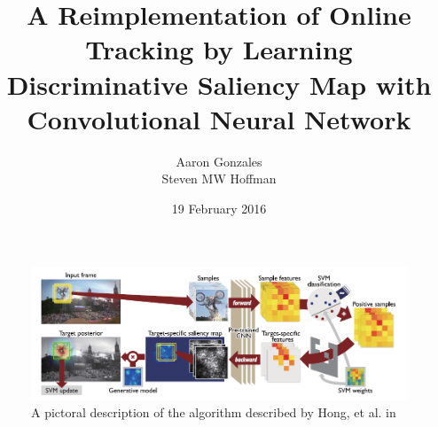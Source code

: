 \documentclass{sig-alternate-05-2015}
\begin{document}


\title{A Reimplementation of Online Tracking by Learning Discriminative Saliency Map with Convolutional Neural Network}

\author{
%
%
\alignauthor
Aaron Gonzales\\
\alignauthor
Steven MW Hoffman \\
}
\date{19 February 2016}

\maketitle

\begin{figure}[t]
\centering
\includegraphics[width=\textwidth]{algorithm}
\caption{A pictoral description of the algorithm described by Hong, et al. in \cite{hong2015online}}
\label{fig:algor}
\end{figure}
\end{document}
